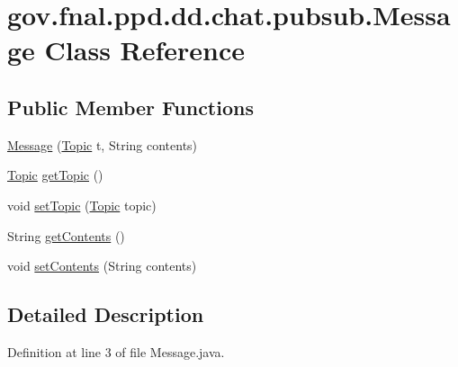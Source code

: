\hypertarget{classgov_1_1fnal_1_1ppd_1_1dd_1_1chat_1_1pubsub_1_1Message}{\section{gov.\-fnal.\-ppd.\-dd.\-chat.\-pubsub.\-Message Class Reference}
\label{classgov_1_1fnal_1_1ppd_1_1dd_1_1chat_1_1pubsub_1_1Message}
}
\subsection*{Public Member Functions}
\begin{DoxyCompactItemize}
\item 
\hyperlink{classgov_1_1fnal_1_1ppd_1_1dd_1_1chat_1_1pubsub_1_1Message_acd9e65989171895865e371e202a6c52e}{Message} (\hyperlink{classgov_1_1fnal_1_1ppd_1_1dd_1_1chat_1_1pubsub_1_1Topic}{Topic} t, String contents)
\item 
\hyperlink{classgov_1_1fnal_1_1ppd_1_1dd_1_1chat_1_1pubsub_1_1Topic}{Topic} \hyperlink{classgov_1_1fnal_1_1ppd_1_1dd_1_1chat_1_1pubsub_1_1Message_a431024e20052c0ed1f9970173d5b2f55}{get\-Topic} ()
\item 
void \hyperlink{classgov_1_1fnal_1_1ppd_1_1dd_1_1chat_1_1pubsub_1_1Message_ab14ebad0595070b95c185bc019284a24}{set\-Topic} (\hyperlink{classgov_1_1fnal_1_1ppd_1_1dd_1_1chat_1_1pubsub_1_1Topic}{Topic} topic)
\item 
String \hyperlink{classgov_1_1fnal_1_1ppd_1_1dd_1_1chat_1_1pubsub_1_1Message_a070746624b260b754e6278d3f3cb6174}{get\-Contents} ()
\item 
void \hyperlink{classgov_1_1fnal_1_1ppd_1_1dd_1_1chat_1_1pubsub_1_1Message_aafbbd0b5c758ac4ce05a81e48ec2d3b8}{set\-Contents} (String contents)
\end{DoxyCompactItemize}


\subsection{Detailed Description}


Definition at line 3 of file Message.\-java.



